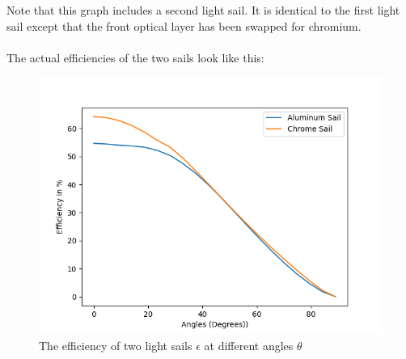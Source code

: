 \documentclass[14pt]{article}
\begin{document}
Note that this graph includes a second light sail. It is identical to the first light sail except that the front
optical layer has been swapped for chromium.\\
\\
The actual efficiencies of the two sails look like this:

\begin{figure}[H]
  \centering
  \includegraphics[width=12cm]{./python/output/efficiency.png}
  \caption{The efficiency of two light sails $\epsilon$ at different angles $\theta$}
  \label{fig:efficiency}
\end{figure}
\end{document}
